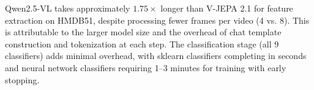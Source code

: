 Qwen2.5-VL takes approximately $1.75\times$ longer than V-JEPA 2.1 for feature extraction on HMDB51, despite processing fewer frames per video (4 vs. 8). This is attributable to the larger model size and the overhead of chat template construction and tokenization at each step. The classification stage (all 9 classifiers) adds minimal overhead, with sklearn classifiers completing in seconds and neural network classifiers requiring 1--3 minutes for training with early stopping.

